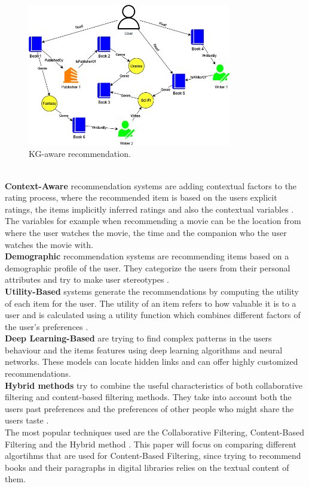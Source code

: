 \documentclass[conference]{IEEEtran}
\begin{document}
%
\begin{figure}[!htb]
\centering
\includegraphics[width=3.5in]{img/knowledge_graph_example.png}
\caption{KG-aware recommendation.}
\label{fig:knowledge_graph_example}
\end{figure}\\
%
\textbf{Context-Aware} recommendation systems are adding contextual factors to the rating process, where the recommended item is based on the users explicit ratings, the items implicitly inferred ratings and also the contextual variables \cite{Haruna2017}. The variables for example when recommending a movie can be the location from where the user watches the movie, the time and the companion who the user watches the movie with.\\
\textbf{Demographic} recommendation systems are recommending items based on a demographic profile of the user. They categorize the users from their personal attributes and try to make user stereotypes \cite{Burke2002331}.\\
\textbf{Utility-Based} systems generate the recommendations by computing the utility of each item for the user. The utility of an item refers to how valuable it is to a user and is calculated using a utility function which combines different factors of the user's preferences \cite{Burke2002331}.\\
\textbf{Deep Learning-Based} are trying to find complex patterns in the users behaviour and the items features using deep learning algorithms and neural networks. These models can locate hidden links and can offer highly customized recommendations.\\
\textbf{Hybrid methods} try to combine the useful characteristics of both collaborative filtering and content-based filtering methods. They take into account both the users past preferences and the preferences of other people who might share the users taste \cite{melville:aaai02}. \\
%
The most popular techniques used are the Collaborative Filtering, Content-Based Filtering and the Hybrid method \cite{pub.1072601078}. This paper will focus on comparing different algortihms that are used for Content-Based Filtering, since trying to recommend books and their paragraphs in digital libraries relies on the textual content of them.
\end{document}
